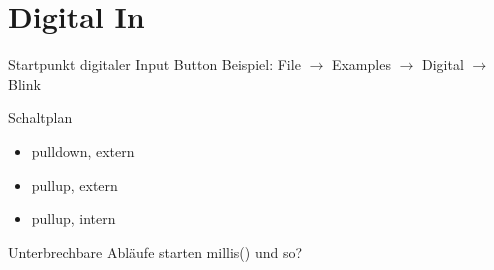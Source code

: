 \documentclass[bigger]{beamer}
\begin{document}
\section{Digital In}
\label{sec-3}
\begin{frame}[label=sec-3-1]{Startpunkt digitaler Input}
Button Beispiel: File $\rightarrow$ Examples $\rightarrow$ Digital $\rightarrow$ Blink
\end{frame}

\begin{frame}[label=sec-3-2]{Schaltplan}
\begin{itemize}
\item pulldown, extern
\item pullup, extern
\item pullup, intern
\end{itemize}
\end{frame}

\begin{frame}[label=sec-3-3]{Unterbrechbare Abläufe starten}
millis() und so?
\end{frame}
\end{document}
